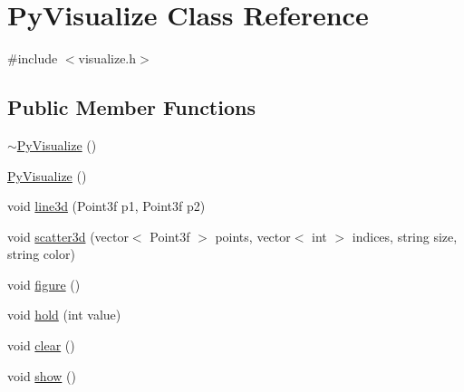\hypertarget{classPyVisualize}{\section{Py\-Visualize Class Reference}
\label{d9/d65/classPyVisualize}
}


{\ttfamily \#include $<$visualize.\-h$>$}

\subsection*{Public Member Functions}
\begin{DoxyCompactItemize}
\item 
\hyperlink{classPyVisualize_a7eeb07d3b232a009ba01e4b9d1855fde}{$\sim$\-Py\-Visualize} ()
\item 
\hyperlink{classPyVisualize_a642b1f0c54f5f4aabb934f5a9a4d6d6e}{Py\-Visualize} ()
\item 
void \hyperlink{classPyVisualize_ac36905e01ec6015d753dd32d7b07040c}{line3d} (Point3f p1, Point3f p2)
\item 
void \hyperlink{classPyVisualize_a2c4789570b9e3ee2ed740320d1523f75}{scatter3d} (vector$<$ Point3f $>$ points, vector$<$ int $>$ indices, string size, string color)
\item 
void \hyperlink{classPyVisualize_a47e7523dc15fd0c644f95637f951d7e6}{figure} ()
\item 
void \hyperlink{classPyVisualize_a70d61beb8e08d26839be2bef86e10c54}{hold} (int value)
\item 
void \hyperlink{classPyVisualize_a0ae2472f04fadf3148902434a0872bfc}{clear} ()
\item 
void \hyperlink{classPyVisualize_a6457ed75dd451e54d750016d89b91d1d}{show} ()
\end{DoxyCompactItemize}


